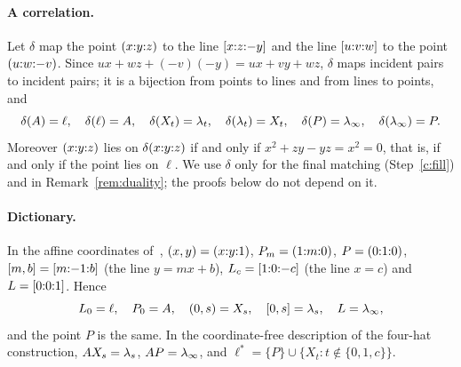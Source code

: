 \paragraph{A correlation.} Let $\delta$ map the point $({x}{:}{y}{:}{z})$ to the line $[{x}{:}{z}{:}{-y}]$ and the line $[{u}{:}{v}{:}{w}]$ to the point $({u}{:}{w}{:}{-v})$. Since $u x + w z + (-v)(-y) = ux + vy + wz$, $\delta$ maps incident pairs to incident pairs; it is a bijection from points to lines and from lines to points, and
\[
\delta(A) = \ell,\quad \delta(\ell) = A,\quad \delta(X_t) = \lambda_t,\quad \delta(\lambda_t) = X_t,\quad \delta(P) = \lambda_\infty,\quad \delta(\lambda_\infty) = P.
\]
Moreover $({x}{:}{y}{:}{z})$ lies on $\delta({x}{:}{y}{:}{z})$ if and only if $x^2 + zy - yz = x^2 = 0$, that is, if and only if the point lies on $\ell$. We use $\delta$ only for the final matching (Step~\ref{c:fill}) and in Remark~\ref{rem:duality}; the proofs below do not depend on it.

\paragraph{Dictionary.} In the affine coordinates of~\cite{AL}, $(x,y) = ({x}{:}{y}{:}{1})$, $P_m = ({1}{:}{m}{:}{0})$, $P = ({0}{:}{1}{:}{0})$, $[m,b] = [{m}{:}{-1}{:}{b}]$ (the line $y = mx+b$), $L_c = [{1}{:}{0}{:}{-c}]$ (the line $x = c$) and $L = [{0}{:}{0}{:}{1}]$. Hence
\[
L_0 = \ell,\quad P_0 = A,\quad (0,s) = X_s,\quad [0,s] = \lambda_s,\quad L = \lambda_\infty,
\]
and the point $P$ is the same. In the coordinate-free description of the four-hat construction, $AX_s = \lambda_s$, $AP = \lambda_\infty$, and $\ell^* = \{P\} \cup \{X_t : t \notin \{0,1,c\}\}$.


